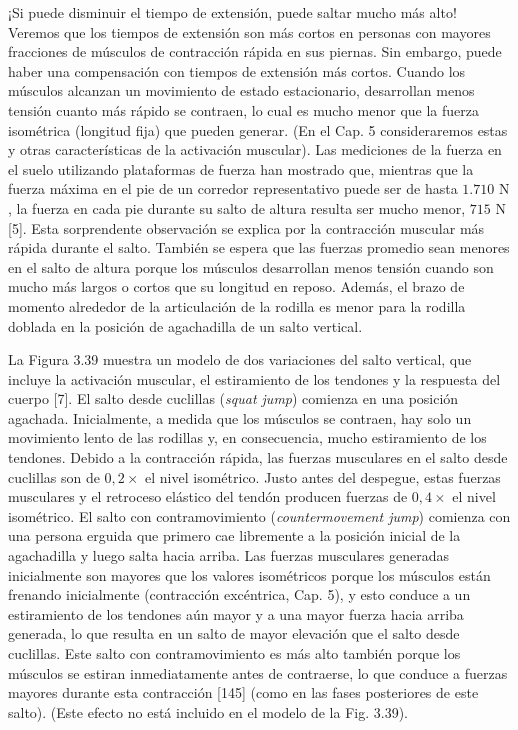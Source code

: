 \documentclass[12pt]{book}
\begin{document}
¡Si puede disminuir el tiempo de extensión, puede saltar mucho más alto! Veremos que los tiempos de extensión son más cortos en personas con mayores fracciones de músculos de contracción rápida en sus piernas. Sin embargo, puede haber una compensación con tiempos de extensión más cortos. Cuando los músculos alcanzan un movimiento de estado estacionario, desarrollan menos tensión cuanto más rápido se contraen, lo cual es mucho menor que la fuerza isométrica (longitud fija) que pueden generar. (En el Cap. 5 consideraremos estas y otras características de la activación muscular). Las mediciones de la fuerza en el suelo utilizando plataformas de fuerza han mostrado que, mientras que la fuerza máxima en el pie de un corredor representativo puede ser de hasta $1.710\text{ N}$, la fuerza en cada pie durante su salto de altura resulta ser mucho menor, $715\text{ N}$ [5]. Esta sorprendente observación se explica por la contracción muscular más rápida durante el salto. También se espera que las fuerzas promedio sean menores en el salto de altura porque los músculos desarrollan menos tensión cuando son mucho más largos o cortos que su longitud en reposo. Además, el brazo de momento alrededor de la articulación de la rodilla es menor para la rodilla doblada en la posición de agachadilla de un salto vertical.

La Figura 3.39 muestra un modelo de dos variaciones del salto vertical, que incluye la activación muscular, el estiramiento de los tendones y la respuesta del cuerpo [7]. El salto desde cuclillas (\textit{squat jump}) comienza en una posición agachada. Inicialmente, a medida que los músculos se contraen, hay solo un movimiento lento de las rodillas y, en consecuencia, mucho estiramiento de los tendones. Debido a la contracción rápida, las fuerzas musculares en el salto desde cuclillas son de $0,2\times$ el nivel isométrico. Justo antes del despegue, estas fuerzas musculares y el retroceso elástico del tendón producen fuerzas de $0,4\times$ el nivel isométrico. El salto con contramovimiento (\textit{countermovement jump}) comienza con una persona erguida que primero cae libremente a la posición inicial de la agachadilla y luego salta hacia arriba. Las fuerzas musculares generadas inicialmente son mayores que los valores isométricos porque los músculos están frenando inicialmente (contracción excéntrica, Cap. 5), y esto conduce a un estiramiento de los tendones aún mayor y a una mayor fuerza hacia arriba generada, lo que resulta en un salto de mayor elevación que el salto desde cuclillas. Este salto con contramovimiento es más alto también porque los músculos se estiran inmediatamente antes de contraerse, lo que conduce a fuerzas mayores durante esta contracción [145] (como en las fases posteriores de este salto). (Este efecto no está incluido en el modelo de la Fig. 3.39).
\end{document}
